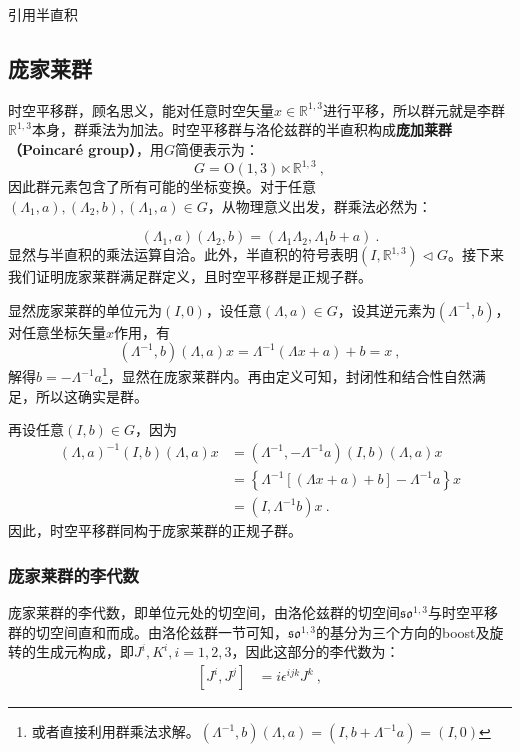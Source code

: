 

\begin{issues}
\issueTODO 引用半直积
\end{issues}


\subsection{庞家莱群}
时空平移群，顾名思义，能对任意时空矢量$x\in \mathbb R^{1,3} $进行平移，所以群元就是李群$\mathbb R^{1,3}$本身，群乘法为加法。时空平移群与洛伦兹群的半直积构成\textbf{庞加莱群（Poincaré group）}，用$G$简便表示为：
\begin{equation}
G= \mathrm{O}(1,3) \ltimes\mathbb{R}^{1,3}~,
\end{equation}
因此群元素包含了所有可能的坐标变换。对于任意$(\Lambda_1,a),(\Lambda_2,b),(\Lambda_1,a)\in G$，从物理意义出发，群乘法必然为：

\begin{equation}
(\Lambda_1,a)(\Lambda_2,b)=(\Lambda_1\Lambda_2,\Lambda_1b+a)~.
\end{equation}
显然与半直积的乘法运算自洽。此外，半直积的符号表明$(I,\mathbb R^{1,3})\vartriangleleft G$。接下来我们证明庞家莱群满足群定义，且时空平移群是正规子群。

显然庞家莱群的单位元为$(I,0)$，设任意$(\Lambda,a)\in G$，设其逆元素为$(\Lambda^{-1},b)$，对任意坐标矢量$x$作用，有
\begin{equation}
(\Lambda^{-1},b)(\Lambda,a)x=\Lambda^{-1}(\Lambda x+a)+b=x~,
\end{equation}
解得$b=-\Lambda^{-1} a$\footnote{或者直接利用群乘法求解。$(\Lambda^{-1},b)(\Lambda,a)=(I,b+\Lambda^{-1}a)=(I,0)$}，显然在庞家莱群内。再由定义可知，封闭性和结合性自然满足，所以这确实是群。

再设任意$(I,b)\in G$，因为
\begin{equation}
\begin{aligned}
(\Lambda,a)^{-1}(I,b)(\Lambda,a)x&=(\Lambda^{-1},-\Lambda^{-1}a)(I,b)(\Lambda,a)x\\
&=\left\{\Lambda^{-1}\left [\left(\Lambda x+a \right)+b\right]-\Lambda^{-1}a\right\}x\\
&=(I,\Lambda^{-1}b)x~.
\end{aligned}
\end{equation}
因此，时空平移群同构于庞家莱群的正规子群。



\subsubsection{庞家莱群的李代数}
庞家莱群的李代数，即单位元处的切空间，由洛伦兹群的切空间$\mathfrak {so}^{1,3}$与时空平移群的切空间直和而成。由洛伦兹群一节可知，$\mathfrak {so}^{1,3}$的基分为三个方向的boost及旋转的生成元构成，即$J^i,K^i,i=1,2,3$，因此这部分的李代数为：
\begin{equation}
\begin{aligned}
[J^i,J^j]&=i\epsilon^{ijk}J^k~,
\end{aligned}
\end{equation}


